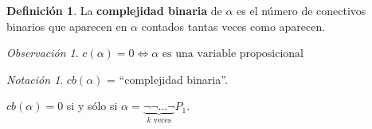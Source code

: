 \documentclass[a4paper,11pt]{article}
\theoremstyle{definition}
\newtheorem{defn}{Definición}[section]
\theoremstyle{remark}
\newtheorem*{remk}{Observación}
\newtheorem*{notc}{Notación}
\begin{document}
\begin{defn}
La \textbf{complejidad binaria} de $\alpha$ es el número de conectivos binarios
que aparecen en $\alpha$ contados tantas veces como aparecen.
\end{defn}

\begin{remk}
$c(\alpha) = 0 \iff \alpha\text{ es una variable proposicional}$
\end{remk}

\begin{notc}
$cb(\alpha)$ = ``complejidad binaria''.

$cb(\alpha) = 0$ si y sólo si $\alpha = \underbrace{\neg\neg\dots\neg}_{k\text{ veces}} P_1$.
\end{notc}
\end{document}
